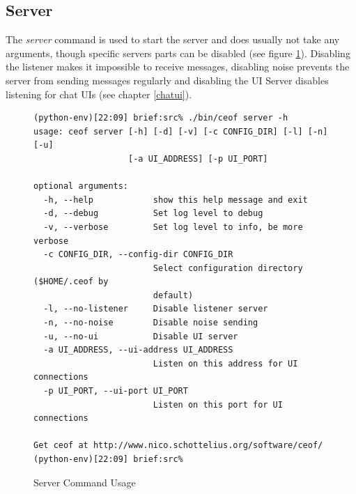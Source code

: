 \subsection{Server}
The \textit{server} command is used to start
the server and does usually not take any arguments,
though specific servers parts can be disabled
(see figure \ref{serverusage}). Disabling the listener
makes it impossible to receive messages, disabling
noise prevents the server from sending messages regularly
and disabling the UI Server disables listening for chat
UIs (see chapter \ref{chatui}).
\begin{figure}[htbp]
\caption{Server Command Usage}
\label{serverusage}
\begin{verbatim}
(python-env)[22:09] brief:src% ./bin/ceof server -h
usage: ceof server [-h] [-d] [-v] [-c CONFIG_DIR] [-l] [-n] [-u]
                   [-a UI_ADDRESS] [-p UI_PORT]

optional arguments:
  -h, --help            show this help message and exit
  -d, --debug           Set log level to debug
  -v, --verbose         Set log level to info, be more verbose
  -c CONFIG_DIR, --config-dir CONFIG_DIR
                        Select configuration directory ($HOME/.ceof by
                        default)
  -l, --no-listener     Disable listener server
  -n, --no-noise        Disable noise sending
  -u, --no-ui           Disable UI server
  -a UI_ADDRESS, --ui-address UI_ADDRESS
                        Listen on this address for UI connections
  -p UI_PORT, --ui-port UI_PORT
                        Listen on this port for UI connections

Get ceof at http://www.nico.schottelius.org/software/ceof/
(python-env)[22:09] brief:src% 
\end{verbatim}
\end{figure}
